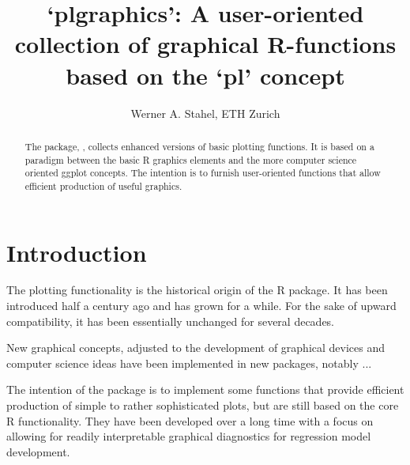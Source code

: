 \documentclass[11pt]{article}\usepackage[]{graphicx}\usepackage[]{color}
\makeatletter
\newenvironment{kframe}{%
 \def\at@end@of@kframe{}%
 \ifinner\ifhmode%
  \def\at@end@of@kframe{\end{minipage}}%
  \begin{minipage}{\columnwidth}%
 \fi\fi%
 \def\FrameCommand##1{\hskip\@totalleftmargin \hskip-\fboxsep
 \colorbox{shadecolor}{##1}\hskip-\fboxsep
     \hskip-\linewidth \hskip-\@totalleftmargin \hskip\columnwidth}%
 \MakeFramed {\advance\hsize-\width
   \@totalleftmargin\z@ \linewidth\hsize
   \@setminipage}}%
 {\par\unskip\endMakeFramed%
 \at@end@of@kframe}
\newenvironment{knitrout}{}{} %
\makeatother
\begin{document}
\baselineskip 15pt
\parskip 10pt

\title{\vspace*{-10mm}
`plgraphics': A user-oriented collection of graphical R-functions based on
 the `pl' concept}
\author{Werner A. Stahel, ETH Zurich}
\maketitle

\begin{abstract}\noindent
The package, , collects enhanced versions of basic plotting
functions. It is based on a paradigm between the basic R graphics elements
and the more computer science oriented ggplot concepts.
The intention is to furnish user-oriented functions that allow efficient
production of useful graphics.
\end{abstract}

\begin{knitrout}
\color{fgcolor}\begin{kframe}


{\ttfamily\noindent\itshape\color{messagecolor}{\#\# Registered S3 methods overwritten by 'plgraphics':\\\#\#\ \  method\ \ \ \ \ \  from\ \ \ \ \\\#\#\ \  nobs.survreg survival\\\#\#\ \  nobs.coxph\ \  survival}}\end{kframe}
\end{knitrout}

\tableofcontents

\pagebreak
\section{Introduction}

The plotting functionality is the historical origin of the R package.
It has been introduced half a century ago and has grown for a while.
For the sake of upward compatibility, it has been essentially unchanged for
several decades. 

New graphical concepts, adjusted to the development of graphical devices
and computer science ideas have been implemented in new packages, 
notably  ...

The intention of the package  is to implement some functions
that provide efficient production of simple to rather sophisticated plots,
but are still based on the core R functionality.
They have been developed over a long time with a focus on allowing 
for readily interpretable graphical diagnostics for regression model
development. 
\end{document}
